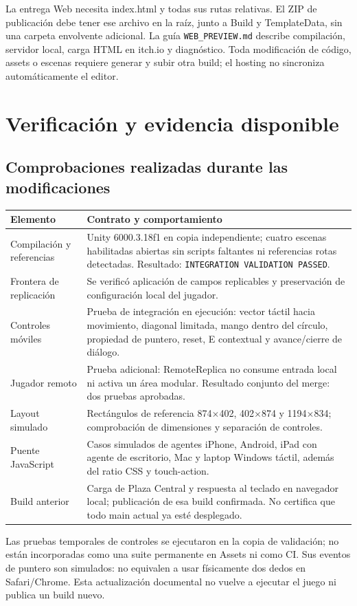 \documentclass[11pt,letterpaper,oneside]{article}
\makeatletter
\newcommand{\code}[1]{\nolinkurl{#1}}
\newenvironment{spec}{\begingroup\small\begin{longtable}{@{}>{\raggedright\arraybackslash}p{0.32\textwidth}>{\raggedright\arraybackslash}p{0.64\textwidth}@{}}\toprule\textbf{Elemento} & \textbf{Contrato y comportamiento} \\ \midrule\endhead}{\bottomrule\end{longtable}\endgroup}
\makeatother
\begin{document}
La entrega Web necesita index.html y todas sus rutas relativas. El ZIP de publicación debe tener ese archivo en la raíz, junto a Build y TemplateData, sin una carpeta envolvente adicional. La guía \code{WEB_PREVIEW.md} describe compilación, servidor local, carga HTML en itch.io y diagnóstico. Toda modificación de código, assets o escenas requiere generar y subir otra build; el hosting no sincroniza automáticamente el editor.

\section{Verificación y evidencia disponible}
\subsection{Comprobaciones realizadas durante las modificaciones}
\begin{spec}
Compilación y referencias & Unity 6000.3.18f1 en copia independiente; cuatro escenas habilitadas abiertas sin scripts faltantes ni referencias rotas detectadas. Resultado: \code{INTEGRATION VALIDATION PASSED}. \\
Frontera de replicación & Se verificó aplicación de campos replicables y preservación de configuración local del jugador. \\
Controles móviles & Prueba de integración en ejecución: vector táctil hacia movimiento, diagonal limitada, mango dentro del círculo, propiedad de puntero, reset, E contextual y avance/cierre de diálogo. \\
Jugador remoto & Prueba adicional: RemoteReplica no consume entrada local ni activa un área modular. Resultado conjunto del merge: dos pruebas aprobadas. \\
Layout simulado & Rectángulos de referencia 874\(\times\)402, 402\(\times\)874 y 1194\(\times\)834; comprobación de dimensiones y separación de controles. \\
Puente JavaScript & Casos simulados de agentes iPhone, Android, iPad con agente de escritorio, Mac y laptop Windows táctil, además del ratio CSS y touch-action. \\
Build anterior & Carga de Plaza Central y respuesta al teclado en navegador local; publicación de esa build confirmada. No certifica que todo main actual ya esté desplegado. \\
\end{spec}
Las pruebas temporales de controles se ejecutaron en la copia de validación; no están incorporadas como una suite permanente en Assets ni como CI. Sus eventos de puntero son simulados: no equivalen a usar físicamente dos dedos en Safari/Chrome. Esta actualización documental no vuelve a ejecutar el juego ni publica un build nuevo.
\end{document}
